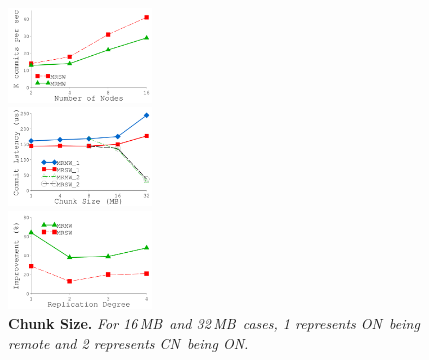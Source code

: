 \documentclass[sigconf]{acmart}
\renewcommand{\em}{\it}
\newcommand{\mycaption}[3]{\caption{\label{#1}{\bf #2} \em\small #3}}
\newcommand{\MB}{\,MB}
\newcommand{\hotpot}{Hotpot}
\newcommand{\on}{ON}
\newcommand{\xn}{CN}
\providecommand{\DIFaddbeginFL}{} %
\providecommand{\DIFaddendFL}{} %
\providecommand{\DIFdelbeginFL}{} %
\providecommand{\DIFdelendFL}{} %
\begin{document}
{  {
\begin{figure}[th]
\begin{minipage}{1.5in}
\begin{center}
\centerline{\includegraphics[width=1.5in]{Figures/g_plot_SOCC_node.pdf}}
\DIFdelbeginFL %
\DIFdelendFL \DIFaddbeginFL \vspace{-0.15in}
\DIFaddendFL \mycaption{fig-nodescale}{\hotpot\ Scalability.}
{
commit throughput with 2 to 16 nodes.
}
\end{center}
\end{minipage}
\begin{minipage}{0.01in}
\hspace{0.01in}
\end{minipage}
\begin{minipage}{1.5in}
\begin{center}
\centerline{\includegraphics[width=1.5in]{Figures/g_plot_SOCC_chunksize.pdf}}
\DIFdelbeginFL %
\DIFdelendFL \DIFaddbeginFL \vspace{-0.15in}
\DIFaddendFL \mycaption{fig-chunksize}{Chunk Size.}
{
For 16\MB\ and 32\MB\ cases, 1 represents \on\ being remote and 2 represents \xn\ being \on. 
}
\end{center}
\end{minipage}
\begin{minipage}{0.01in}
\hspace{0.01in}
\end{minipage}
\begin{minipage}{1.5in}
\begin{center}
\centerline{\includegraphics[width=1.5in]{Figures/g_plot_SOCC_migration.pdf}}

\end{center}
\end{minipage}
\end{figure}}}
\end{document}
